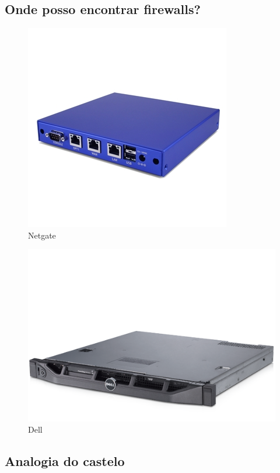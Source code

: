 \subsection{Onde posso encontrar firewalls?}
\begin{frame}
	\begin{figure}
		\centering
		\includegraphics[height=0.3\textheight]{imagens/netgate.jpg}
		\caption{Netgate}
	\end{figure}
	
	\begin{figure}
		\centering
		\includegraphics[height=0.3\textheight]{imagens/dell.png}
		\caption{Dell}
	\end{figure}

\end{frame}


\subsection{Analogia do castelo}


